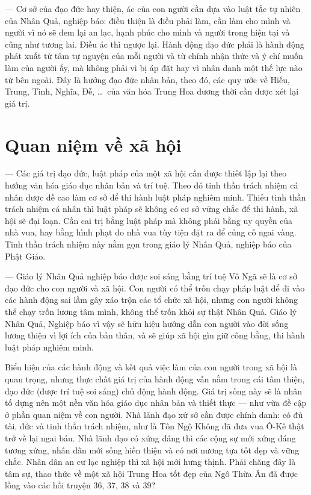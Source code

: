 — Cơ sở của đạo đức hay thiện, ác của con người cần dựa vào luật tắc tự nhiên của Nhân Quả, nghiệp báo: điều thiện là điều phải làm, cần làm cho mình và người vì nó sẽ đem lại an lạc, hạnh phúc cho mình và người trong hiện tại và cũng như tương lai. Điều ác thì ngược lại. Hành động đạo đức phải là hành động phát xuất từ tâm tự nguyện của mỗi người và từ chính nhận thức và ý chí muốn làm của người ấy, mà không phải vì bị áp đặt hay vì nhân danh một thế lực nào từ bên ngoài. Đây là hướng đạo đức nhân bản, theo đó, các quy ước về Hiếu, Trung, Tình, Nghĩa, Đễ, \ldots ~của văn hóa Trung Hoa đương thời cần được xét lại giá trị.

\section{Quan niệm về xã hội} %
\label{sec:36_37_xa_hoi}

— Các giá trị đạo đức, luật pháp của một xã hội cần được thiết lập lại theo hướng văn hóa giáo dục nhân bản và trí tuệ. Theo đó tinh thần trách nhiệm cá nhân được đề cao làm cơ sở để thi hành luật pháp nghiêm minh. Thiếu tinh thần trách nhiệm cá nhân thì luật pháp sẽ không có cơ sở vững chắc để thi hành, xã hội sẽ đại loạn. Cần cai trị bằng luật pháp mà không phải bằng uy quyền của nhà vua, hay bằng hình phạt do nhà vua tùy tiện đặt ra để củng cố ngai vàng. Tinh thần trách nhiệm này nằm gọn trong giáo lý Nhân Quả, nghiệp báo của Phật Giáo.

— Giáo lý Nhân Quả nghiệp báo được soi sáng bằng trí tuệ Vô Ngã sẽ là cơ sở đạo đức cho con người và xã hội. Con người có thể trốn chạy pháp luật để đi vào các hành động sai lầm gây xáo trộn các tổ chức xã hội, nhưng con người không thể chạy trốn lương tâm mình, không thể trốn khỏi sự thật Nhân Quả. Giáo lý Nhân Quả, Nghiệp báo vì vậy sẽ hữu hiệu hướng dẫn con người vào đời sống lương thiện vì lợi ích của bản thân, và sẽ giúp xã hội gìn giữ công bằng, thi hành luật pháp nghiêm minh.

Biểu hiện của các hành động và kết quả việc làm của con người trong xã hội là quan trọng, nhưng thực chất giá trị của hành động vẫn nằm trong cái tâm thiện, đạo đức (được trí tuệ soi sáng) chủ động hành động. Giá trị sống này sẽ là nhân tố dựng nên một nền văn hóa giáo dục nhân bản và thiết thực — như vừa đề cập ở phần quan niệm về con người. Nhà lãnh đạo xứ sở cần được chính danh: có đủ tài, đức và tinh thần trách nhiệm, như là Tôn Ngộ Không đã đưa vua Ô-Kê thật trở về lại ngai báu. Nhà lãnh đạo có xứng đáng thì các cộng sự mới xứng đáng tương xứng, nhân dân mới sống hiền thiện và có nơi nương tựa tốt đẹp và vững chắc. Nhân dân an cư lạc nghiệp thì xã hội mới hưng thịnh. Phải chăng đây là tâm sự, thao thức về một xã hội Trung Hoa tốt đẹp của Ngô Thừa Ân đã được lồng vào các hồi truyện 36, 37, 38 và 39?
